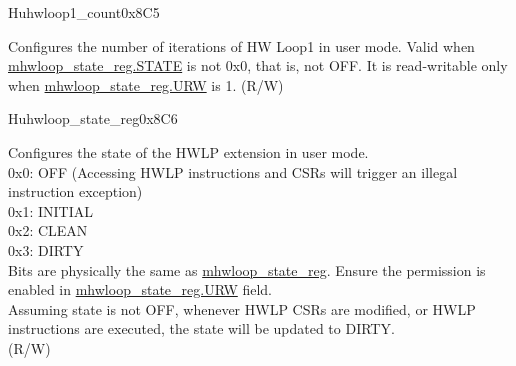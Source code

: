 \begin{register}{H}{uhwloop1\_count}{0x8C5}\label{regdesc:uhloop1_count}
%
%
\regnewline%
\begin{regdesc}\begin{reglist}
\label{fielddesc:UHWLP1_CNT}\item [Count] Configures the number of iterations of HW Loop1 in user mode. Valid when \hyperref[fielddesc:HWSTATE]{mhwloop\_state\_reg.STATE} is not 0x0, that is, not OFF. It is read-writable only when \hyperref[fielddesc:HWSTATE]{mhwloop\_state\_reg.URW} is 1. (R/W)
\end{reglist}\end{regdesc}
\end{register}

\begin{register}{H}{uhwloop\_state\_reg}{0x8C6}\label{regdesc:uhwlp_state_reg}
%
%
\regnewline%
\begin{regdesc}\begin{reglist}
\label{fielddesc:UHWSTATE}\item [STATE] Configures the state of the HWLP extension in user mode. \\
0x0: OFF (Accessing HWLP instructions and CSRs will trigger an illegal instruction exception)\\
0x1: INITIAL\\
0x2: CLEAN\\
0x3: DIRTY\\
Bits are physically the same as \hyperref[regdesc:mhwlp_state_reg]{mhwloop\_state\_reg}. Ensure the permission is enabled in \hyperref[fielddesc:HWSTATE]{mhwloop\_state\_reg.URW} field.\\
Assuming state is not OFF, whenever HWLP CSRs are modified, or HWLP instructions are executed, the state will be updated to DIRTY.\\
(R/W)
\end{reglist}\end{regdesc}
\end{register}
